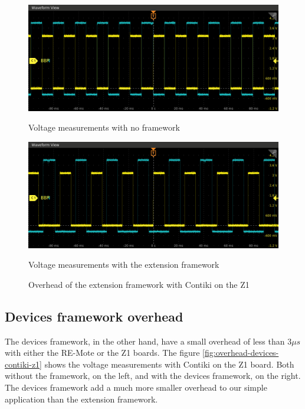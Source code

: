 \begin{figure}[!ht]
  \begin{minipage}{.45\textwidth}
      \centering
      \includegraphics[scale=.25]{assets/reference-value-overhead-contiki-z1.png}
      \caption*{Voltage measurements with no framework}
  \end{minipage}\hfill
  \begin{minipage}{.45\textwidth}        
      \centering
      \includegraphics[scale=.25]{assets/extension-framework-overhead-contiki-z1.png}
      \caption*{Voltage measurements with the extension framework}
  \end{minipage}
  \caption{Overhead of the extension framework with Contiki on the Z1 \label{fig:overhead-extension-contiki-z1}}
\end{figure}

\subsection{Devices framework overhead}

The devices framework, in the other hand, have a small overhead of less than $3\mu s$ with either the RE-Mote or the Z1 boards.
The figure \ref{fig:overhead-devices-contiki-z1} shows the voltage measurements with Contiki on the Z1 board.
Both without the framework, on the left, and with the devices framework, on the right.
The devices framework add a much more smaller overhead to our simple application than the extension framework. %


